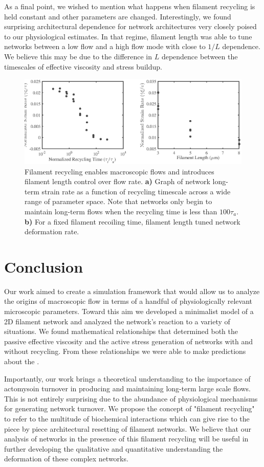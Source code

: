 \documentclass[10pt,letterpaper]{article}
\begin{document}
As a final point, we wished to mention what happens when filament recycling is held constant and other parameters are changed.  Interestingly, we found surprising architectural dependence for network architectures very closely poised to our physiological estimates.  In that regime, filament length was able to tune networks between a low flow and a high flow mode with close to $1/L$ dependence.  We believe this may be due to the difference in $L$ dependence between the timescales of effective viscosity and stress buildup. 
\begin{figure}[h!]
\centering
\includegraphics[width=\hsize]{figures/figure6b}
\caption{\label{fig:flow_form}  Filament recycling enables macroscopic flows and introduces filament length control over flow rate. \textbf{a)}  Graph of network long-term strain rate as a function of recycling timescale across a wide range of parameter space.  Note that networks only begin to maintain long-term flows when the recycling time is less than $100\tau_a$. \textbf{b)} For a fixed filament recoiling time, filament length tuned network deformation rate.}
\end{figure}

\section*{Conclusion}
Our work aimed to create a simulation framework that would allow us to analyze the origins of macroscopic flow in terms of a handful of physiologically relevant microscopic parameters.  Toward this aim we developed a minimalist model of a 2D filament network and analyzed the network's reaction to a variety of situations.  We found mathematical relationships that determined both the passive effective viscosity and the active stress generation of networks with and without recycling.  From these relationships we were able to make predictions about the .  

Importantly, our work brings a theoretical understanding to the importance of actomysoin turnover in producing and maintaining long-term large scale flows.  This is not entirely surprising due to the abundance of physiological mechanisms for generating network turnover.  We propose the concept of "filament recycling" to refer to the multitude of biochemical interactions which can give rise to the piece by piece architectural resetting of filament networks.  We believe that our analysis of networks in the presence of this filament recycling will be useful in further developing the qualitative and quantitative understanding the deformation of these complex networks.
\end{document}
